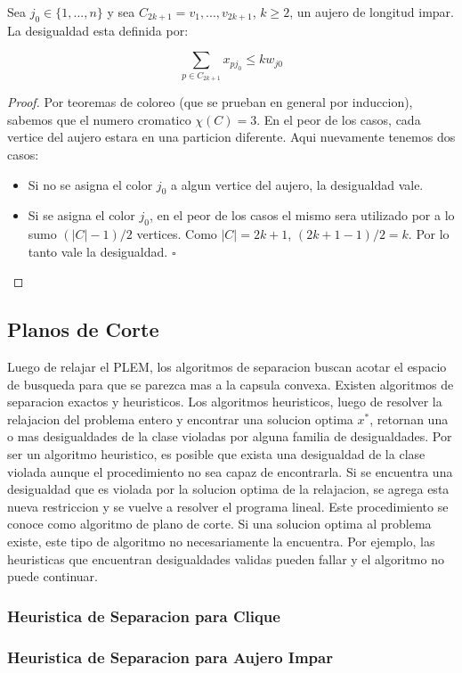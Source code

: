Sea $j_0 \in \{1,...,n\}$ y sea $C_{2k+1} = v_1,...,v_{2k+1}$, $k \geq 2$, un aujero de longitud impar. La desigualdad esta definida por:

\begin{equation}
\sum_{p \in C_{2k+1}} x_{pj_0} \leq k w_{j0}
\end{equation}

\begin{proof}
Por teoremas de coloreo (que se prueban en general por induccion), sabemos que el numero cromatico $\chi(C) = 3$. En el peor de los casos, cada vertice del aujero estara en una particion diferente. Aqui nuevamente tenemos dos casos:

\begin{itemize}
\item Si no se asigna el color $j_0$ a algun vertice del aujero, la desigualdad vale.
\item Si se asigna el color $j_0$, en el peor de los casos el mismo sera utilizado por a lo sumo $(|C|-1)/2$ vertices. Como $|C| = 2k+1$,  $(2k+1-1)/2 = k$. Por lo tanto vale la desigualdad.  \hfill $\square$
\end{itemize}

\end{proof}

\subsection{Planos de Corte}

Luego de relajar el PLEM, los algoritmos de separacion buscan acotar el espacio de busqueda para que se parezca mas a la capsula convexa. Existen algoritmos de separacion exactos y heuristicos. Los algoritmos heuristicos, luego de resolver la relajacion del problema entero y encontrar una solucion optima $x^*$, retornan una o mas desigualdades de la clase violadas por alguna familia de desigualdades. Por ser un algoritmo heuristico, es posible que exista una desigualdad de la clase violada aunque el procedimiento no sea capaz de encontrarla. Si se encuentra una desigualdad que es violada por la solucion optima de la relajacion, se agrega esta nueva restriccion y se vuelve a resolver el programa lineal. Este procedimiento se conoce como algoritmo de plano de corte. Si una solucion optima al problema existe, este tipo de algoritmo no necesariamente la encuentra. Por ejemplo, las heuristicas que encuentran desigualdades validas pueden fallar y el algoritmo no puede continuar.

\subsubsection{Heuristica de Separacion para Clique}

\subsubsection{Heuristica de Separacion para Aujero Impar}